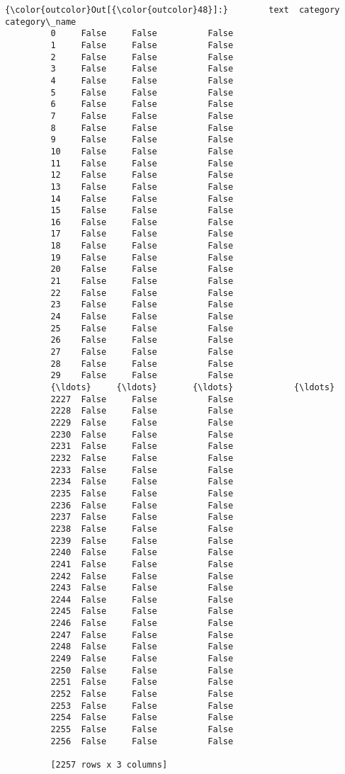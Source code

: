 \documentclass[11pt]{article}
\begin{document}
\begin{Verbatim}[commandchars=\\\{\}]
{\color{outcolor}Out[{\color{outcolor}48}]:}        text  category  category\_name
         0     False     False          False
         1     False     False          False
         2     False     False          False
         3     False     False          False
         4     False     False          False
         5     False     False          False
         6     False     False          False
         7     False     False          False
         8     False     False          False
         9     False     False          False
         10    False     False          False
         11    False     False          False
         12    False     False          False
         13    False     False          False
         14    False     False          False
         15    False     False          False
         16    False     False          False
         17    False     False          False
         18    False     False          False
         19    False     False          False
         20    False     False          False
         21    False     False          False
         22    False     False          False
         23    False     False          False
         24    False     False          False
         25    False     False          False
         26    False     False          False
         27    False     False          False
         28    False     False          False
         29    False     False          False
         {\ldots}     {\ldots}       {\ldots}            {\ldots}
         2227  False     False          False
         2228  False     False          False
         2229  False     False          False
         2230  False     False          False
         2231  False     False          False
         2232  False     False          False
         2233  False     False          False
         2234  False     False          False
         2235  False     False          False
         2236  False     False          False
         2237  False     False          False
         2238  False     False          False
         2239  False     False          False
         2240  False     False          False
         2241  False     False          False
         2242  False     False          False
         2243  False     False          False
         2244  False     False          False
         2245  False     False          False
         2246  False     False          False
         2247  False     False          False
         2248  False     False          False
         2249  False     False          False
         2250  False     False          False
         2251  False     False          False
         2252  False     False          False
         2253  False     False          False
         2254  False     False          False
         2255  False     False          False
         2256  False     False          False
         
         [2257 rows x 3 columns]
\end{Verbatim}
            
\end{document}
